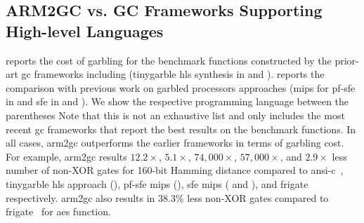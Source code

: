 \subsection{ARM2GC vs. GC Frameworks Supporting High-level Languages}
 reports the cost of garbling for the benchmark functions constructed by the prior-art \acrshort{gc} frameworks including (\gls{tinygarble} \acrshort{hls} synthesis in  and \cite{holzer2012secure, mood2016frigate}).
 reports the comparison with previous work on garbled processors approaches (\gls{mips} for \acrshort{pf-sfe} in  and \acrshort{sfe} in  and \cite{wang2016secure}).
We show the respective programming language between the parentheses
Note that this is not an exhaustive list and only includes the most recent \acrshort{gc} frameworks that report the best results on the benchmark functions.
In all cases, \gls{arm2gc} outperforms the earlier frameworks in terms of garbling cost.
For example, \gls{arm2gc} results $12.2\times$,  $5.1\times$, $74,000\times$, $57,000\times$, and $2.9\times$ less number of non-XOR gates for 160-bit Hamming distance compared to \acrshort{ansi}-\gls{c}~\cite{holzer2012secure}, \gls{tinygarble} \acrshort{hls} approach (), \acrshort{pf-sfe} \gls{mips} (), \acrshort{sfe} \gls{mips} ( and \cite{wang2016secure}), and \gls{frigate}~\cite{mood2016frigate} respectively.
\gls{arm2gc} also results in $38.3\%$ less non-XOR gates compared to \gls{frigate}~\cite{mood2016frigate} for \acrshort{aes} function.

